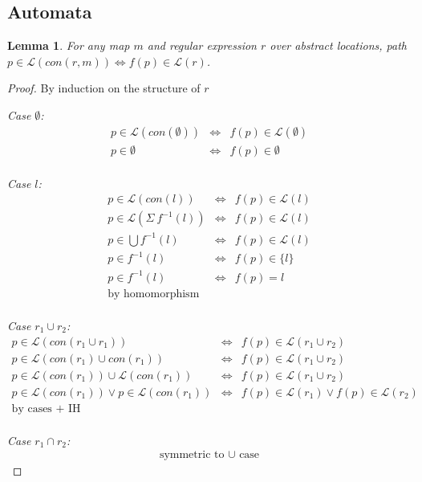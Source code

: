 \documentclass[twocolumn]{sig-alternate-10pt}
\newtheorem{lem}[thm]{Lemma}
\begin{document}
\subsection{Automata}

\newcommand{\Lang}{\ensuremath{\mathcal{L}}}



\begin{lem}
  For any map $m$ and regular expression $r$ over abstract locations, path $p \in \Lang(con(r,m)) \iff f(p) \in \Lang(r)$.
\end{lem}
\begin{proof}
By induction on the structure of $r$

\emph{Case $\emptyset$:}
  \[ \begin{array}{lll}
    p \in \Lang(con(\emptyset)) &\iff& f(p) \in \Lang(\emptyset) \\
    p \in \emptyset &\iff& f(p) \in \emptyset \\
  \end{array} \]

\emph{Case $l$:}
  \[ \begin{array}{lll}
    p \in \Lang(con(l)) &\iff& f(p) \in \Lang(l) \\
    p \in \Lang(\Sigma ~ f^{-1}(l)) &\iff& f(p) \in \Lang(l) \\
    p \in \bigcup f^{-1}(l) &\iff& f(p) \in \Lang(l) \\
    p \in f^{-1}(l) &\iff& f(p) \in \{ l \} \\
    p \in f^{-1}(l) &\iff& f(p) = l \\
    \text{by homomorphism} & & \\
  \end{array} \]

\emph{Case $r_1 \cup r_2$:}
  \[ \begin{array}{lll}
    p \in \Lang(con(r_1 \cup r_1)) &\iff& f(p) \in \Lang(r_1 \cup r_2) \\
    p \in \Lang(con(r_1) \cup con(r_1)) &\iff& f(p) \in \Lang(r_1 \cup r_2) \\
    p \in \Lang(con(r_1)) \cup \Lang(con(r_1)) &\iff& f(p) \in \Lang(r_1 \cup r_2) \\
    p \in \Lang(con(r_1)) \vee p \in \Lang(con(r_1)) 
       &\iff& 
       f(p) \in \Lang(r_1) \vee f(p) \in \Lang(r_2) \\
    \text{by cases + IH} & & \\
  \end{array} \]

\emph{Case $r_1 \cap r_2$:} 
  \[ \begin{array}{c}
    \text{symmetric to } \cup \text{ case}
  \end{array} \]


\end{proof}
\end{document}

